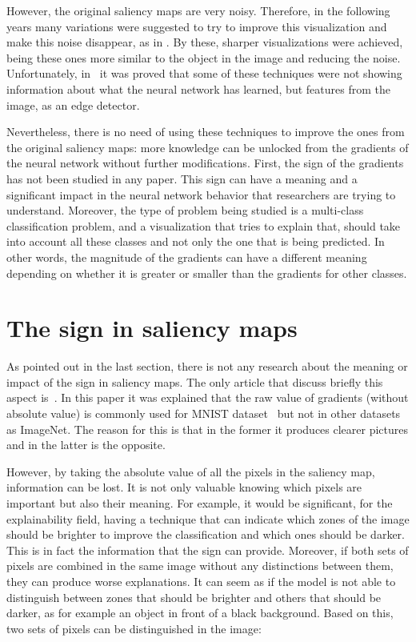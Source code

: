 \documentclass[preprint,12pt]{elsarticle}
\begin{document}
However, the original saliency maps are very noisy. Therefore, in the following years many variations were suggested to try to improve this visualization and make this noise disappear, as in \cite{springenbergStrivingSimplicityAll2015a, sundararajanAxiomaticAttributionDeep2017, shrikumarNotJustBlack2017}. By these, sharper visualizations were achieved, being these ones more similar to the object in the image and reducing the noise. Unfortunately, in~\cite{adebayoSanityChecksSaliency2018} it was proved that some of these techniques were not showing information about what the neural network has learned, but features from the image, as an edge detector. 

Nevertheless, there is no need of using these techniques to improve the ones from the original saliency maps: more knowledge can be unlocked from the gradients of the neural network without further modifications. First, the sign of the gradients has not been studied in any paper. This sign can have a meaning and a significant impact in the neural network behavior that researchers are trying to understand. Moreover, the type of problem being studied is a multi-class classification problem, and a visualization that tries to explain that, should take into account all these classes and not only the one that is being predicted. In other words, the magnitude of the gradients can have a different meaning depending on whether it is greater or smaller than the gradients for other classes. 

\section{The sign in saliency maps}
\label{sec:the sign in saliency maps}
As pointed out in the last section, there is not any research about the meaning or impact of the sign in saliency maps. The only article that discuss briefly this aspect is~\cite{smilkovSmoothGradRemovingNoise}. In this paper it was explained that the raw value of gradients (without absolute value) is commonly used for MNIST dataset~\cite{MNISTHandwrittenDigit} but not in other datasets as ImageNet. The reason for this is that in the former it produces clearer pictures and in the latter is the opposite. 

However, by taking the absolute value of all the pixels in the saliency map, information can be lost. It is not only valuable knowing which pixels are important but also their meaning. For example, it would be significant, for the explainability field, having a technique that can indicate which zones of the image should be brighter to improve the classification and which ones should be darker. This is in fact the information that the sign can provide. Moreover, if both sets of pixels are combined in the same image without any distinctions between them, they can produce worse explanations. It can seem as if the model is not able to distinguish between zones that should be brighter and others that should be darker, as for example an object in front of a black background. Based on this, two sets of pixels can be distinguished in the image:
\end{document}
